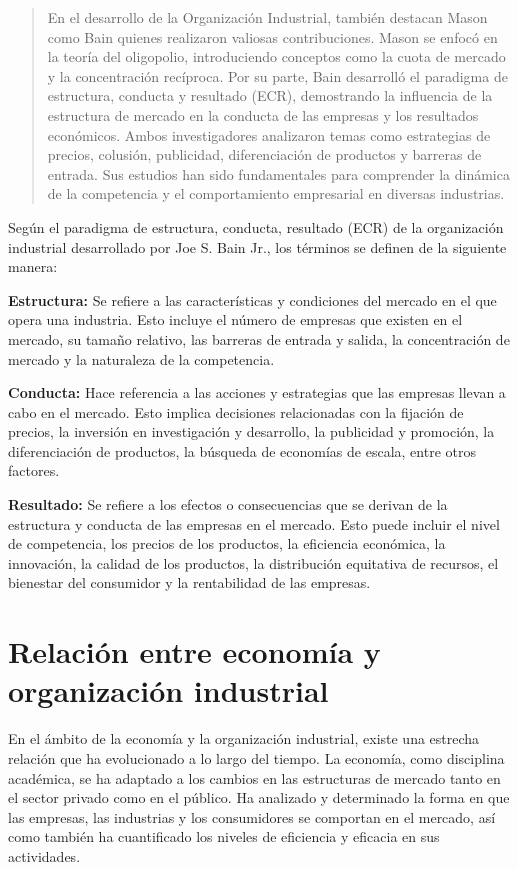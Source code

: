\documentclass[
  doc,
  floatsintext,
  longtable,
  a4paper,
  nolmodern,
  notxfonts,
  notimes,
  12pt,
  colorlinks=true,linkcolor=blue,citecolor=blue,urlcolor=blue]{apa7}
\begin{document}
\begin{quote}
En el desarrollo de la Organización Industrial, también destacan Mason
como Bain quienes realizaron valiosas contribuciones. Mason se enfocó en
la teoría del oligopolio, introduciendo conceptos como la cuota de
mercado y la concentración recíproca. Por su parte, Bain desarrolló el
paradigma de estructura, conducta y resultado (ECR), demostrando la
influencia de la estructura de mercado en la conducta de las empresas y
los resultados económicos. Ambos investigadores analizaron temas como
estrategias de precios, colusión, publicidad, diferenciación de
productos y barreras de entrada. Sus estudios han sido fundamentales
para comprender la dinámica de la competencia y el comportamiento
empresarial en diversas industrias.
\end{quote}

Según el paradigma de estructura, conducta, resultado (ECR) de la
organización industrial desarrollado por Joe S. Bain Jr., los términos
se definen de la siguiente manera:

\textbf{Estructura:} Se refiere a las características y condiciones del
mercado en el que opera una industria. Esto incluye el número de
empresas que existen en el mercado, su tamaño relativo, las barreras de
entrada y salida, la concentración de mercado y la naturaleza de la
competencia.

\textbf{Conducta:} Hace referencia a las acciones y estrategias que las
empresas llevan a cabo en el mercado. Esto implica decisiones
relacionadas con la fijación de precios, la inversión en investigación y
desarrollo, la publicidad y promoción, la diferenciación de productos,
la búsqueda de economías de escala, entre otros factores.

\textbf{Resultado:} Se refiere a los efectos o consecuencias que se
derivan de la estructura y conducta de las empresas en el mercado. Esto
puede incluir el nivel de competencia, los precios de los productos, la
eficiencia económica, la innovación, la calidad de los productos, la
distribución equitativa de recursos, el bienestar del consumidor y la
rentabilidad de las empresas.

\section{Relación entre economía y organización
industrial}\label{relaciuxf3n-entre-economuxeda-y-organizaciuxf3n-industrial}

En el ámbito de la economía y la organización industrial, existe una
estrecha relación que ha evolucionado a lo largo del tiempo. La
economía, como disciplina académica, se ha adaptado a los cambios en las
estructuras de mercado tanto en el sector privado como en el público. Ha
analizado y determinado la forma en que las empresas, las industrias y
los consumidores se comportan en el mercado, así como también ha
cuantificado los niveles de eficiencia y eficacia en sus actividades.
\end{document}
